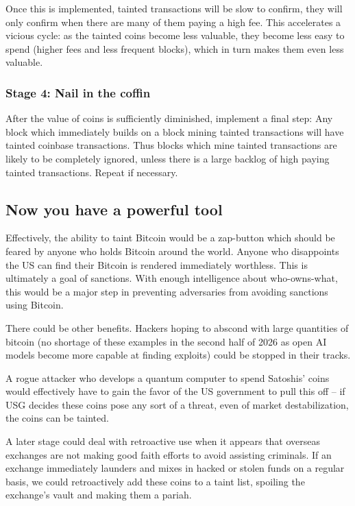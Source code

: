 \documentclass{article}%
\begin{document}
Once this is implemented, tainted transactions will be slow to confirm, they
will only confirm when there are many of them paying a high fee. This accelerates a vicious cycle: as the tainted
coins become less valuable, they become less easy to spend (higher fees and
less frequent blocks), which in turn makes them even less valuable.

\subsubsection{Stage 4: Nail in the coffin}

After the value of coins is sufficiently diminished, implement a final step:
 Any block which immediately builds on a block mining tainted transactions
will have tainted coinbase transactions.  Thus blocks which mine tainted
transactions are likely to be completely ignored, unless there is a large
backlog of high paying tainted transactions.  Repeat if necessary.

\subsection{Now you have a powerful tool}

Effectively, the ability to taint Bitcoin would be a zap-button  which should be feared by anyone
who holds Bitcoin around the world. Anyone who disappoints the US
can find their Bitcoin is rendered immediately worthless.  This is ultimately
a goal of sanctions.  With enough intelligence about who-owns-what, this
would be a major step in preventing adversaries from avoiding sanctions using
Bitcoin.

There could be other benefits.  Hackers hoping to abscond with large
quantities of bitcoin (no shortage of these examples in the second half of 2026 as open AI models become more capable at finding exploits) 
 could be stopped in their tracks.

A rogue attacker who develops a quantum computer to spend Satoshis' coins
would effectively have to gain the favor of the US government to pull this off --
if USG decides these coins pose any sort of a threat, even of market
destabilization, the coins can be tainted.

A later stage could deal with retroactive use when it appears that overseas
exchanges are not making good faith efforts to avoid assisting criminals.  If
an exchange immediately launders and mixes in hacked or stolen funds on a
regular basis, we could retroactively add these coins to a
taint list, spoiling the exchange's vault and making them a pariah.
\end{document}
